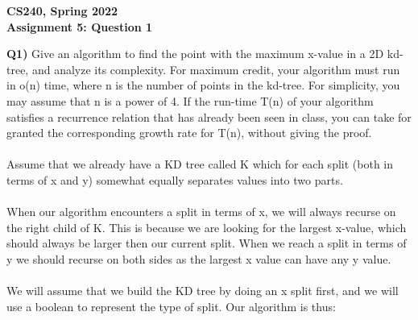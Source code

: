 \documentclass[12pt]{article}
\begin{document}
\begin{center}
{\Large\textbf{CS240, Spring 2022}}\\
\vspace{2mm}
{\Large\textbf{Assignment 5: Question 1}}\\
\vspace{3mm}
\end{center}

\begin{adjustwidth}{0em}{0pt}
\textbf{Q1)} Give an algorithm to find the point with the maximum x-value in a 2D kd-tree, and analyze
its complexity. For maximum credit, your algorithm must run in o(n) time, where n is the
number of points in the kd-tree. For simplicity, you may assume that n is a power of 4. If the
run-time T(n) of your algorithm satisfies a recurrence relation that has already been seen in
class, you can take for granted the corresponding growth rate for T(n), without giving the
proof. \\\\
Assume that we already have a KD tree called K which for each split (both in terms of x and y) somewhat equally separates values into two parts.\\\\
When our algorithm encounters a split in terms of x, we will always recurse on the right child of K. This is because we are looking for the largest x-value, which should always be larger then our current split. When we reach a split in terms of y we should recurse on both sides as the largest x value can have any y value. \\\\
We will assume that we build the KD tree by doing an x split first, and we will use a boolean to represent the type of split. Our algorithm is thus:


\end{adjustwidth}
\end{document}
